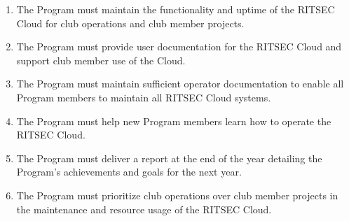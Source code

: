 
\begin{enumerate}
    \item The Program must maintain the functionality and uptime of the RITSEC
        Cloud for club operations and club member projects.
    \item The Program must provide user documentation for the RITSEC Cloud and
        support club member use of the Cloud.
    \item The Program must maintain sufficient operator documentation to enable
        all Program members to maintain all RITSEC Cloud systems.
    \item The Program must help new Program members learn how to operate the
        RITSEC Cloud.
    \item The Program must deliver a report at the end of the year detailing
        the Program's achievements and goals for the next year.
    \item The Program must prioritize club operations over club member projects
        in the maintenance and resource usage of the RITSEC Cloud.
\end{enumerate}